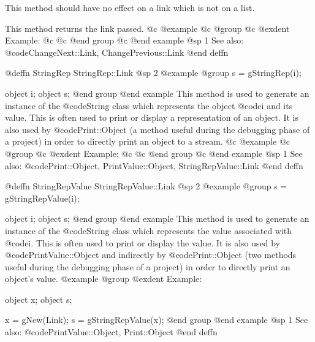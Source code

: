 This method should have no effect on a link which is not on a list.

This method returns the link passed.
@c @example
@c @group
@c @exdent Example:
@c 
@c @end group
@c @end example
@sp 1
See also:  @code{ChangeNext::Link, ChangePrevious::Link}
@end deffn








@deffn {StringRep} StringRep::Link
@sp 2
@example
@group
s = gStringRep(i);

object  i;
object  s;
@end group
@end example
This method is used to generate an instance of the @code{String} class
which represents the object @code{i} and its value.  This is often used
to print or display a representation of an object.  It is also used
by @code{Print::Object} (a method useful during the debugging phase of
a project) in order to directly print an object to a stream.
@c @example
@c @group
@c @exdent Example:
@c
@c @end group
@c @end example
@sp 1
See also:  @code{Print::Object, PrintValue::Object, StringRepValue::Link}
@end deffn











@deffn {StringRepValue} StringRepValue::Link
@sp 2
@example
@group
s = gStringRepValue(i);

object  i;
object  s;
@end group
@end example
This method is used to generate an instance of the @code{String} class
which represents the value associated with @code{i}.  This is often
used to print or display the value.  It is also used by
@code{PrintValue::Object} and indirectly by @code{Print::Object}
(two methods useful during the debugging phase of a project)
in order to directly print an object's value.
@example
@group
@exdent Example:

object  x;
object  s;

x = gNew(Link);
s = gStringRepValue(x);
@end group
@end example
@sp 1
See also:  @code{PrintValue::Object, Print::Object}
@end deffn












